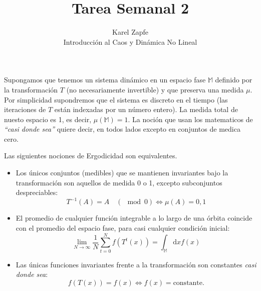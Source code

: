 \documentclass[12pt]{article}
\newcommand{\M}{\mathbb{M}}
\newcommand{\rd}{\!\!\mathrm{d}}
\newenvironment{lemma}[2][Lema]{\begin{trivlist}
\item[\hskip \labelsep {\bfseries #1}\hskip \labelsep {\bfseries #2.}]}{\end{trivlist}}
\begin{document}
 
 
\title{Tarea Semanal 2}%
\author{Karel Zapfe\\ %
Introducción al Caos y Dinámica No Lineal} %
 
\maketitle
 Supongamos que tenemos un sistema dinámico en un espacio fase $\M$ definido 
por la transformación $T$ (no necesariamente invertible) y que preserva
una medida $\mu$. Por simplicidad supondremos que el sistema es discreto
en el tiempo (las iteraciones de $T$ están indexadas por un número entero).
La medida total de nuesto espacio es 1, es decir, $\mu(\M)=1$.
La noción que usan los matematicos de  \emph{``casi donde sea''} 
quiere decir, en todos lados excepto en conjuntos de medica cero. 
 

\begin{lemma}{Definiciones Equivalentes} 
  Las siguientes nociones de Ergodicidad son equivalentes. 
  \begin{itemize}
  \item Los únicos conjuntos (medibles) que se mantienen invariantes bajo la transformación son aquellos de medida 0 o 1, excepto subconjuntos despreciables:
    \begin{equation*}
      T^{-1}(A)=A \quad ( \mod 0 )\Leftrightarrow \mu(A)=0, 1
    \end{equation*}
  \item El promedio de cualquier función integrable a lo largo de una órbita
    coincide con el promedio del espacio fase, para casi cualquier condición
    inicial:
    \begin{equation*}
      \lim_{N\rightarrow \infty} \frac{1}{N}\sum_{t=0}^{N} f(T^t(x)) = \int_\M \rd x f(x)
    \end{equation*}
  \item Las únicas funciones invariantes frente a la transformación 
    son constantes \emph{casi donde sea}:
    \begin{equation*}
      f(T(x))=f(x) \Leftrightarrow f(x)=\text{constante}.
    \end{equation*}
  \end{itemize}

\end{lemma}
\end{document}
